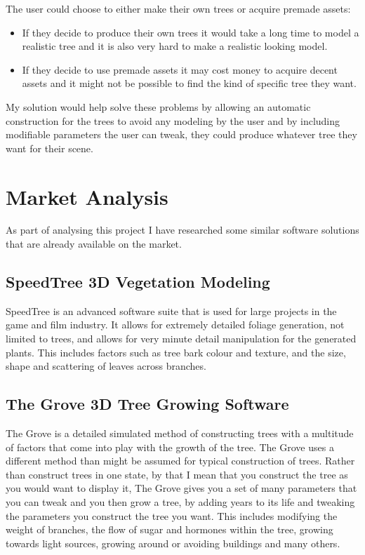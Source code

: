 \documentclass[proposal]{cmpreport}
\begin{document}
The user could choose to either make their own trees or acquire premade assets:
\begin{itemize}
        \item If they decide to produce their own trees it would take a long time to 
              model a realistic tree and it is also very hard to make a realistic 
              looking model.
        \item If they decide to use premade assets it may cost money to acquire decent 
              assets and it might not be possible to find the kind of specific tree they 
              want. 
\end{itemize}

My solution would help solve these problems by allowing an automatic construction 
for the trees to avoid any modeling by the user and by including modifiable parameters 
the user can tweak, they could produce whatever tree they want for their scene.

\pagebreak
\section{Market Analysis}
As part of analysing this project I have researched some similar software solutions 
that are already available on the market.

\subsection{SpeedTree 3D Vegetation Modeling}
SpeedTree \cite{speedtree} is an advanced software suite that is used for large projects 
in the game and film industry. It allows for extremely detailed foliage generation, 
not limited to trees, and allows for very minute detail manipulation for the generated 
plants. This includes factors such as tree bark colour and texture, and the size, shape 
and scattering of leaves across branches.

\subsection{The Grove 3D Tree Growing Software}
The Grove \cite{thegrove} is a detailed simulated method of constructing trees with a 
multitude of factors that come into play with the growth of the tree. The Grove uses a 
different method than might be assumed for typical construction of trees. Rather than 
construct trees in one state, by that I mean that you construct the tree as you would 
want to display it, The Grove gives you a set of many parameters that you can tweak and 
you then grow a tree, by adding years to its life and tweaking the parameters you 
construct the tree you want. This includes modifying the weight of branches, the flow 
of sugar and hormones within the tree, growing towards light sources, growing around 
or avoiding buildings and many others.
\end{document}
